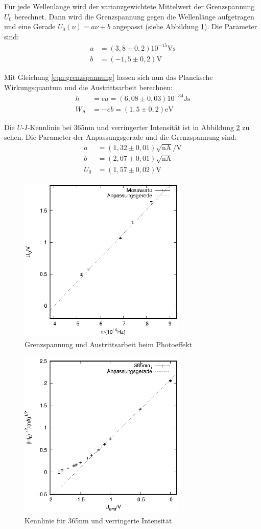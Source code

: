 Für jede Wellenlänge wird der varianzgewichtete Mittelwert der Grenzspannung $U_0$ berechnet. Dann wird die Grenzspannung gegen die Wellenlänge aufgetragen und eine Gerade $U_0(\nu)=a\nu+b$ angepasst (siehe Abbildung \ref{planck}). Die Parameter sind: 
\begin{align*}
  a&=(3,8 \pm 0,2)10^{-15}\mathrm{Vs}\\  
  b&=(-1,5 \pm 0,2) \mathrm{V}
\end{align*}


Mit Gleichung \ref{eqn:grenzspannung} lassen sich nun das Plancksche Wirkungsquantum und die Austrittsarbeit berechnen:
\begin{align*}
  h&=ea=(6,08 \pm 0,03)10^{-34}\mathrm{Js}\\
  W_\mathrm{A}&=-eb=(1,5 \pm 0,2)\mathrm{eV}
\end{align*}

Die $U$-$I$-Kennlinie bei $365$nm und verringerter Intensität ist in Abbildung \ref{fig:lowintensity} zu sehen. Die Parameter der Anpassungsgerade und die Grenzspannung sind:
\begin{align*}
  a&=(1,32 \pm 0,01)\sqrt{\mathrm{nA}}/\mathrm{V}\\
  b&=(2,07 \pm 0,01)\sqrt{\mathrm{nA}}\\
  U_0&=(1,57 \pm 0,02)\mathrm{V}   
\end{align*}

\begin{figure}[h]
  \centering
  \includegraphics[width=8cm]{data/Messung_photoeffekt/f_u.eps}
  \caption{Grenzspannung und Austrittsarbeit beim Photoeffekt}
  \label{planck}
\end{figure}

\begin{figure}[h]
  \centering
  \includegraphics[width=8cm]{data/Messung_photoeffekt/365nm_low_intensity.eps}
  \caption{Kennlinie für 365nm und verringerte Intensität}
  \label{fig:lowintensity}
\end{figure}

\newpage
